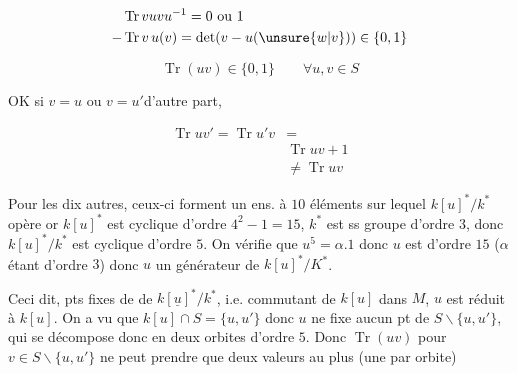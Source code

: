 \[
\begin{aligned}
&\operatorname{Tr}vuvu^{-1}=0\text{ ou }1\\
-&\operatorname{Tr}v\,u(v)=\det(v-u(\unsure{w|v}))\in\{0,1\}
\end{aligned}
\]

\[
\operatorname{Tr}(uv)\in\{0,1\}\qquad\forall u,v\in S
\]


OK si $v=u$ ou $v=u'$\qquad d'autre part,

\[
\begin{aligned}\operatorname{Tr}uv'=\operatorname{Tr}u'v&=\\[-2pt]&\operatorname{Tr}uv+1\\&\ne\operatorname{Tr}uv\end{aligned}
\]

Pour les dix autres, ceux-ci forment un ens. à $10$ éléments sur lequel $k[u]^*/k^*$ opère or $k[u]^*$ est cyclique d'ordre $4^2-1=15$, $k^*$ est ss groupe d'ordre $3$, donc $k[u]^*/k^*$ est cyclique d'ordre $5$. On vérifie que $u^5=\alpha.1$ donc $u$ est d'ordre $15$ ($\alpha$ étant d'ordre $3$) donc $u$  un générateur de $k[u]^*/K^*$.

Ceci dit, pts fixes de    de $k[\underline u]^*/k^*$, i.e.  commutant de $k[u]$ dans $M$,  $u$ est réduit à $k[u]$. On a vu que $k[u]\cap S=\{u,u'\}$ donc $u$ ne fixe aucun pt de $S\smallsetminus\{u,u'\}$, qui se décompose donc en deux orbites d'ordre $5$. Donc $\operatorname{Tr}(uv)$ pour $v\in S\smallsetminus\{u,u'\}$ ne peut prendre que deux valeurs au plus (une par orbite)


